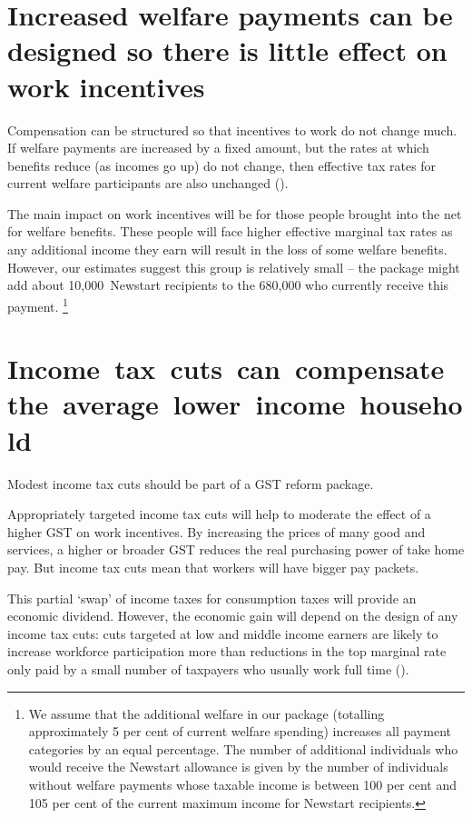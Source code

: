 \section{Increased welfare payments can be designed so there is little effect on work incentives\label{sec:GST-3-3}}
Compensation can be structured so that incentives to work do not change much. If welfare payments are increased by a fixed amount, but the rates at which benefits reduce (as incomes go up) do not change, then effective tax rates for current welfare participants are also unchanged ().

The main impact on work incentives will be for those people brought into the net for welfare benefits. These people will face higher effective marginal tax rates as any additional income they earn will result in the loss of some welfare benefits. However, our estimates suggest this group is relatively small – the package might add about 10,000~Newstart recipients to the 680,000 who currently receive this payment.%
\footnote{We assume that the additional welfare in our package (totalling approximately 5 per cent of current welfare spending) increases all payment categories by an equal percentage. The number of additional individuals who would receive the Newstart allowance is given by the number of individuals without welfare payments whose taxable income is between 100 per cent and 105 per cent of the current maximum income for Newstart recipients.}   

\section{\mbox{Income tax cuts can compensate the average lower income household}\label{sec:GST-3-4}}
Modest income tax cuts should be part of a GST reform package.

Appropriately targeted income tax cuts will help to moderate the effect of a higher GST on work incentives. By increasing the prices of many good and services, a higher or broader GST reduces the real purchasing power of take home pay. But income tax cuts mean that workers will have bigger pay packets. 

This partial ‘swap’ of income taxes for consumption taxes will provide an economic dividend. However, the economic gain will depend on the design of any income tax cuts: cuts targeted at low and middle income earners are likely to increase workforce participation more than reductions in the top marginal rate only paid by a small number of taxpayers who usually work full time (). 

